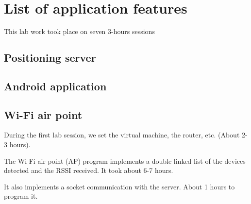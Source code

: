 \section{List of application features}

This lab work took place on seven 3-hours sessions

\subsection{Positioning server}

\subsection{Android application}

\subsection{Wi-Fi air point}

During the first lab session, we set the virtual machine, the router, etc.
(About 2-3 hours).

The Wi-Fi air point (AP) program implements a double linked list of the devices
detected and the RSSI received. It took about 6-7 hours.

It also implements a socket communication with the server. About 1 hours to
program it.





